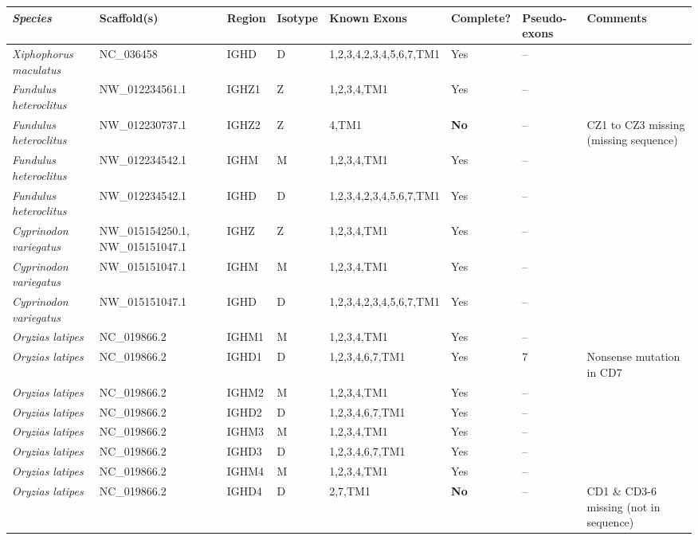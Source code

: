 	\begin{landscape}
	\centering
	\vspace*{\fill}
    \scriptsize
    \begin{threeparttable}
\begin{tabular}{>{\itshape}lllllllp{4cm}}
  \toprule \textnormal{\textbf{Species}} & \textbf{Scaffold(s)} & \textbf{Region} & \textbf{Isotype} & \textbf{Known Exons} \tnote{1} & \textbf{Complete?} & \textbf{Pseudo-exons} & \textbf{Comments} \\ 
  \midrule Xiphophorus maculatus & NC\_036458 & IGHD & D & 1,2,3,4,2,3,4,5,6,7,TM1 & Yes & -- &  \\ 
  Fundulus heteroclitus & NW\_012234561.1 & IGHZ1 & Z & 1,2,3,4,TM1 & Yes & -- &  \\ 
  Fundulus heteroclitus & NW\_012230737.1 & IGHZ2 & Z & 4,TM1 & \textbf{No} & -- & CZ1 to CZ3 missing (missing sequence) \\ 
  Fundulus heteroclitus & NW\_012234542.1 & IGHM & M & 1,2,3,4,TM1 & Yes & -- &  \\ 
  Fundulus heteroclitus & NW\_012234542.1 & IGHD & D & 1,2,3,4,2,3,4,5,6,7,TM1 & Yes & -- &  \\ 
  Cyprinodon variegatus & NW\_015154250.1, NW\_015151047.1 & IGHZ & Z & 1,2,3,4,TM1 & Yes & -- &  \\ 
  Cyprinodon variegatus & NW\_015151047.1 & IGHM & M & 1,2,3,4,TM1 & Yes & -- &  \\ 
  Cyprinodon variegatus & NW\_015151047.1 & IGHD & D & 1,2,3,4,2,3,4,5,6,7,TM1 & Yes & -- &  \\ 
  Oryzias latipes & NC\_019866.2 & IGHM1 & M & 1,2,3,4,TM1 & Yes & -- &  \\ 
  Oryzias latipes & NC\_019866.2 & IGHD1 & D & 1,2,3,4,6,7,TM1 & Yes & 7 & Nonsense mutation in CD7 \\ 
  Oryzias latipes & NC\_019866.2 & IGHM2 & M & 1,2,3,4,TM1 & Yes & -- &  \\ 
  Oryzias latipes & NC\_019866.2 & IGHD2 & D & 1,2,3,4,6,7,TM1 & Yes & -- &  \\ 
  Oryzias latipes & NC\_019866.2 & IGHM3 & M & 1,2,3,4,TM1 & Yes & -- &  \\ 
  Oryzias latipes & NC\_019866.2 & IGHD3 & D & 1,2,3,4,6,7,TM1 & Yes & -- &  \\ 
  Oryzias latipes & NC\_019866.2 & IGHM4 & M & 1,2,3,4,TM1 & Yes & -- &  \\ 
  Oryzias latipes & NC\_019866.2 & IGHD4 & D & 2,7,TM1 & \textbf{No} & -- & CD1 \& CD3-6 missing (not in sequence) \\ 

\end{tabular}
\end{threeparttable}
\end{landscape}
